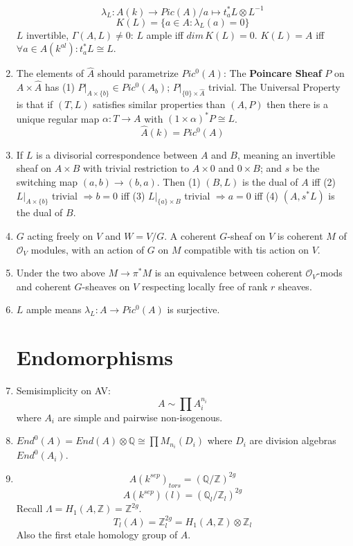 \documentclass{article}
\newcommand{\Q}{\mathbb{Q}}
\newcommand{\Z}{\mathbb{Z}}
\newcommand{\OO}{\mathcal{O}}
\newcommand{\ra}{\rightarrow}
\newcommand{\Ra}{\Rightarrow}
\begin{document}
\begin{multicols}{2}
\begin{enumerate}
\[\lambda_L:A(k) \ra Pic(A)/ a \mapsto t_a^* L \otimes L^{-1}\]
\[K(L) = \{a \in A: \lambda_L(a) = 0\}\]
$L$ invertible, $\Gamma(A,L) \neq 0$: $L$ ample iff $dim\,K(L) = 0$.
$K(L) = A$ iff $\forall a \in A(k^{al}): t_a^*L \cong L$.

\item The elements of $\hat{A}$ should parametrize $Pic^0(A)$: The \textbf{Poincare Sheaf} $P$ on $A \times \hat{A}$ has (1) $P|_{A \times \{b\}} \in Pic^0(A_b)$; $P|_{\{0\} \times \hat{A}}$ trivial. The Universal Property is that if $(T,L)$ satisfies similar properties than $(A,P)$ then there is a unique regular map $\alpha: T \ra A$ with $(1 \times \alpha)^* P \cong L$. 
\[\hat{A}(k) = Pic^0(A)\]

\item If $L$ is a divisorial correspondence between $A$ and $B$, meaning an invertible sheaf on $A \times B$ with trivial restriction to $A \times 0$ and $0 \times B$; and $s$ be the switching map $(a,b) \ra (b,a)$. Then (1) $(B,L)$ is the dual of $A$ iff (2) $L|_{A \times \{b\}}$ trivial $\Ra b = 0$ iff (3) $L|_{\{a\} \times B}$ trivial $\Ra a = 0$ iff (4) $(A,s^*L)$ is the dual of $B$. 

\item $G$ acting freely on $V$ and $W = V/G$. A coherent $G$-sheaf on $V$ is coherent $M$ of $\OO_V$ modules, with an action of $G$ on $M$ compatible with tis action on $V$. 

\item Under the two above $M \ra \pi^*M$ is an equivalence between coherent $\OO_V$-mods and coherent $G$-sheaves on $V$ respecting locally free of rank $r$ sheaves. 

\item $L$ ample means $\lambda_L: A \ra Pic^0(A)$ is surjective. 

\section{Endomorphisms}
\item Semisimplicity on AV: 
\[A \sim \prod A_i^{n_i}\]
 where $A_i$ are simple and pairwise non-isogenous. 

\item $End^0(A) = End(A) \otimes \Q \cong \prod M_{n_i}(D_i)$ where $D_i$ are division algebras $End^0(A_i)$.  
 
\item 
\[A(k^{sep})_{tors} = (\Q/\Z)^{2g}\]
\[A(k^{sep})(l) = (\Q_l/\Z_l)^{2g}\]
Recall $\Lambda = H_1(A,\Z) = \Z^{2g}$.
\[T_l(A) = \Z_l^{2g} = H_1(A,\Z) \otimes \Z_l\]
Also the first etale homology group of $A$. 


\end{enumerate}
\end{multicols}
\end{document}
